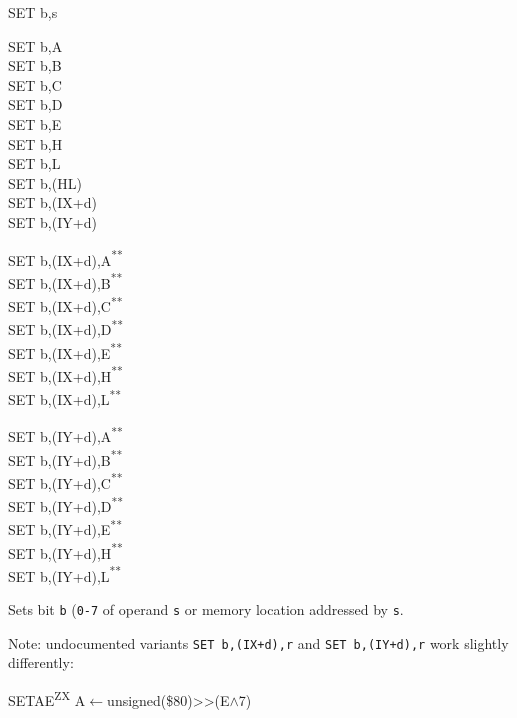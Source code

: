\documentclass[12pt,twoside,openright,a4paper]{book}
\newcommand{\UNDOC}{\textnormal{\textsuperscript{**}}}
\newcommand{\ZXN}{\textnormal{\textsuperscript{ZX}}}
\begin{document}
\begin{basedescript}{
	\desclabelstyle{\multilinelabel}
	\desclabelwidth{3cm}}
\begin{detailitem}{SET b,s}
		\begin{DetailVariants}
			SET b,A\\
			SET b,B\\
			SET b,C\\
			SET b,D\\
			SET b,E\\
			SET b,H\\
			SET b,L\\
			SET b,(HL)\\
			SET b,(IX+d)\\
			SET b,(IY+d)

			\columnbreak
			SET b,(IX+d),A\UNDOC\\
			SET b,(IX+d),B\UNDOC\\
			SET b,(IX+d),C\UNDOC\\
			SET b,(IX+d),D\UNDOC\\
			SET b,(IX+d),E\UNDOC\\
			SET b,(IX+d),H\UNDOC\\
			SET b,(IX+d),L\UNDOC

			\columnbreak
			SET b,(IY+d),A\UNDOC\\
			SET b,(IY+d),B\UNDOC\\
			SET b,(IY+d),C\UNDOC\\
			SET b,(IY+d),D\UNDOC\\
			SET b,(IY+d),E\UNDOC\\
			SET b,(IY+d),H\UNDOC\\
			SET b,(IY+d),L\UNDOC
		\end{DetailVariants}

		Sets bit {\tt b} ({\tt 0-7} of operand {\tt s} or memory location addressed by {\tt s}.

		Note: undocumented variants {\tt SET b,(IX+d),r} and {\tt SET b,(IY+d),r} work slightly differently:


		\DetailNoEffect
						
		\begin{DetailTiming}
		\end{DetailTiming}

	\end{detailitem}

	\begin{detailitem}{SETAE\ZXN}
		{A$\leftarrow$unsigned(\$80)>>(E$\wedge$7)}


\end{detailitem}
\end{basedescript}
\end{document}
